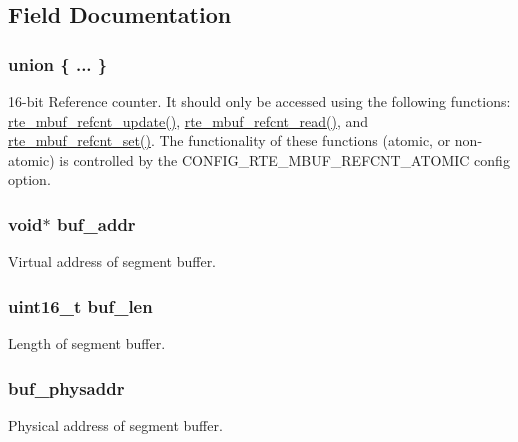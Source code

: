 \subsection{Field Documentation}
\hypertarget{structrte__mbuf_ac3bf5b22ac7aac6be64acefd4557e109}{}\subsubsection[{"@31}]{\setlength{\rightskip}{0pt plus 5cm}union \{ ... \} }\label{structrte__mbuf_ac3bf5b22ac7aac6be64acefd4557e109}
16-\/bit Reference counter. It should only be accessed using the following functions\+: \hyperlink{rte__mbuf_8h_abb7eb5fa1599b7f6237040b95d8893de}{rte\+\_\+mbuf\+\_\+refcnt\+\_\+update()}, \hyperlink{rte__mbuf_8h_a9cad099c1aedd46af38588ad97dabd65}{rte\+\_\+mbuf\+\_\+refcnt\+\_\+read()}, and \hyperlink{rte__mbuf_8h_a86233fc739e93e6d0136034ea7066e69}{rte\+\_\+mbuf\+\_\+refcnt\+\_\+set()}. The functionality of these functions (atomic, or non-\/atomic) is controlled by the C\+O\+N\+F\+I\+G\+\_\+\+R\+T\+E\+\_\+\+M\+B\+U\+F\+\_\+\+R\+E\+F\+C\+N\+T\+\_\+\+A\+T\+O\+M\+I\+C config option. \hypertarget{structrte__mbuf_a9db3d388a1381e68e509017a6e7d0f12}{}
\subsubsection[{buf\+\_\+addr}]{\setlength{\rightskip}{0pt plus 5cm}void$\ast$ buf\+\_\+addr}\label{structrte__mbuf_a9db3d388a1381e68e509017a6e7d0f12}
Virtual address of segment buffer. \hypertarget{structrte__mbuf_a7ae671bb1805f6f7313b9301aca17eb6}{}
\subsubsection[{buf\+\_\+len}]{\setlength{\rightskip}{0pt plus 5cm}uint16\+\_\+t buf\+\_\+len}\label{structrte__mbuf_a7ae671bb1805f6f7313b9301aca17eb6}
Length of segment buffer. \hypertarget{structrte__mbuf_a6f9e031fb601226363d0106789df32f7}{}
\subsubsection[{buf\+\_\+physaddr}]{ buf\+\_\+physaddr}\label{structrte__mbuf_a6f9e031fb601226363d0106789df32f7}
Physical address of segment buffer. \hypertarget{structrte__mbuf_ad00f52c8ce94438b6190a0e501a79fab}{}
